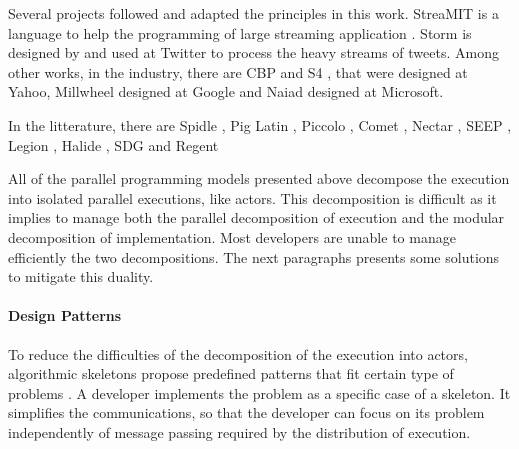 Several projects followed and adapted the principles in this work.
StreaMIT is a language to help the programming of large streaming application \cite{Thies2002}.
Storm \cite{Toshniwal2014} is designed by and used at Twitter to process the heavy streams of tweets.
Among other works, in the industry, there are
CBP \cite{Logothetis2010} and
S4 \cite{Neumeyer2010}, that were designed at Yahoo,
Millwheel \cite{Akidau2013} designed at Google and
Naiad \cite{Murray2013} designed at Microsoft.

In the litterature, there are
Spidle \cite{Consel2003},
Pig Latin \cite{Olston2008},
Piccolo \cite{Power2010},
Comet \cite{He2010},
Nectar \cite{Gunda2010},
SEEP \cite{Migliavacca2010},
Legion \cite{Bauer2012},
Halide \cite{Ragan-Kelley2013},
SDG \cite{Fernandez2014a} and
Regent \cite{Slaughter2015}




All of the parallel programming models presented above decompose the execution into isolated parallel executions, like actors.
This decomposition is difficult as it implies to manage both the parallel decomposition of execution and the modular decomposition of implementation.
Most developers are unable to manage efficiently the two decompositions.
The next paragraphs presents some solutions to mitigate this duality.

\paragraph{Design Patterns}

To reduce the difficulties of the decomposition of the execution into actors, algorithmic skeletons propose predefined patterns that fit certain type of problems \cite{Cole1988, Dean2008, McCool2010, Gonzalez-Velez2010}.
A developer implements the problem as a specific case of a skeleton.
It simplifies the communications, so that the developer can focus on its problem independently of message passing required by the distribution of execution.



